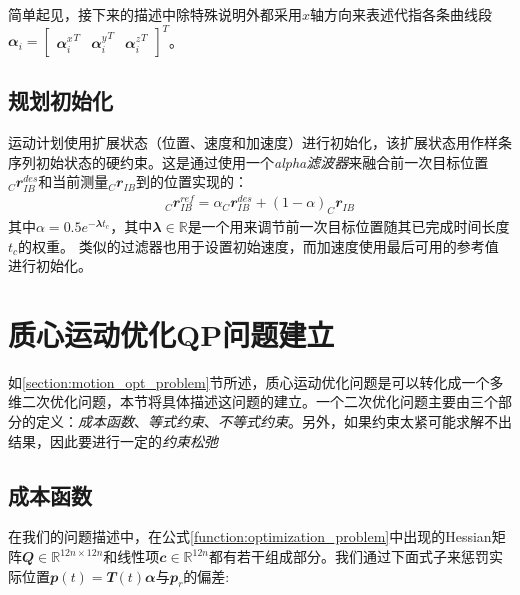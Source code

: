 简单起见，接下来的描述中除特殊说明外都采用$x$轴方向来表述代指各条曲线段$\mathbfit{\alpha}_i = \begin{bmatrix}{\mathbfit{\alpha}_i^x}^T & {\mathbfit{\alpha}_i^y}^T & {\mathbfit{\alpha}_i^z}^T\end{bmatrix}^T$。


\subsection[规划初始化]{\label{section:optimization_init}规划初始化}
运动计划使用扩展状态（位置、速度和加速度）进行初始化，该扩展状态用作样条序列初始状态的硬约束。这是通过使用一个\emph{alpha滤波器}来融合前一次目标位置$_C\mathbfit{r}_{IB}^{des}$和当前测量$_C\mathbfit{r}_{IB}$到的位置实现的：
\begin{align}
    _C\mathbfit{r}_{IB}^{ref}=\alpha _C\mathbfit{r}_{IB}^{des}+(1-\alpha)_C\mathbfit{r}_{IB}
\end{align}
其中$\alpha=0.5e^{-\mathbfit{\lambda} t_c}$，其中$\mathbfit{\lambda}\in \mathbb{R}$是一个用来调节前一次目标位置随其已完成时间长度$t_c$的权重。
类似的过滤器也用于设置初始速度，而加速度使用最后可用的参考值进行初始化。












\section[质心运动优化QP问题的建立]{\label{section:com_opt_setup}质心运动优化QP问题建立}
如\ref{section:motion_opt_problem}节所述，质心运动优化问题是可以转化成一个多维二次优化问题，本节将具体描述这问题的建立。一个二次优化问题主要由三个部分的定义：\emph{成本函数}、\emph{等式约束}、\emph{不等式约束}。另外，如果约束太紧可能求解不出结果，因此要进行一定的\emph{约束松弛}

\subsection[成本函数]{\label{section:cost_function}成本函数}


在我们的问题描述中，在公式\eqref{function:optimization_problem}中出现的Hessian矩阵$\mathbfit{Q}\in\mathbb{R}^{12n\times12n}$和线性项$\mathbfit{c}\in\mathbb{R}^{12n}$都有若干组成部分。我们通过下面式子来惩罚实际位置$\mathbfit{p}(t)=\mathbfit{T}(t)\mathbfit{\alpha}$与$\mathbfit{p}_r$的偏差:

